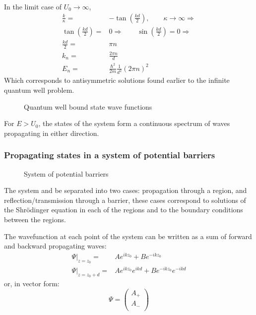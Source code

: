 				In the limit case of $U_0 \rightarrow \infty$,
				\begin{align}
					\frac{k}{\kappa} =& -\tan(\frac{kd}{2}),\qquad \kappa \rightarrow \infty \Rightarrow \\
					\tan(\frac{kd}{2}) =& 0 \Rightarrow\qquad	\sin(\frac{kd}{2}) = 0 \Rightarrow\\
					\frac{kd}{2} =& \pi n \\
					k_n =& \frac{2\pi n}{d} \\
					E_n =& \frac{\hbar^2}{2m}\frac{1}{d^2}\left(2\pi n\right)^2
				\end{align}
				Which corresponds to antisymmetric solutions found earlier to the infinite quantum well problem.		
				
			\begin{figure}[!h]
				\centering
				
				\caption{Quantum well bound state wave functions}
			\end{figure}
			For $E > U_0$, the states of the system form a continuous spectrum of waves propagating in either direction.
		\subsubsection{Propagating states in a system of potential barriers}
			\begin{figure}[!h]
				\centering
				
				\caption{System of potential barriers}
			\end{figure}			
			The system and be separated into two cases: propagation through a region, and reflection/transmission through a barrier, these cases correspond to solutions of the Shr\"odinger equation in each of the regions and to the boundary conditions between the regions.
			
			The wavefunction at each point of the system can be written as a sum of forward and backward propagating waves:
			\begin{align}
				\Psi|_{z=z_{0}} =& Ae^{ikz_0} + Be^{-ikz_0} \\
				\Psi|_{z=z_{0}+d} =& Ae^{ikz_0}e^{ikd} + Be^{-ikz_0}e^{-ikd}				
			\end{align}
			or, in vector form:
			\begin{equation}
				\Psi = 
				\begin{pmatrix}
				A_+ \\
				A_- \\
				\end{pmatrix}
			\end{equation}
			
